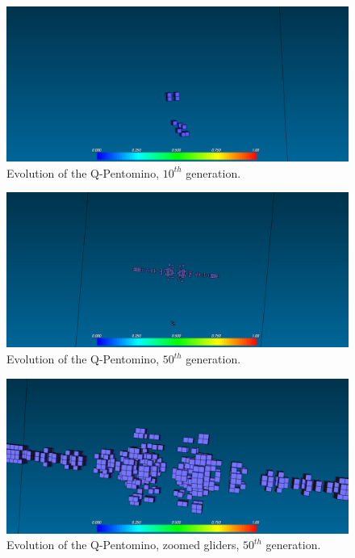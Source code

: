 \begin{figure}
	\centering
	\includegraphics[scale=0.3]{pentominoes_ss/q_10.png}
	\caption{Evolution of the Q-Pentomino, $10^{th}$ generation.}
  \label{fig:ss-pent:q-10}
\end{figure}

\begin{figure}
	\centering
	\includegraphics[scale=0.3]{pentominoes_ss/q_50.png}
	\caption{Evolution of the Q-Pentomino, $50^{th}$ generation.}
  \label{fig:ss-pent:q-50}
\end{figure}

\begin{figure}
	\centering
	\includegraphics[scale=0.3]{pentominoes_ss/q_50_gliders.png}
	\caption{Evolution of the Q-Pentomino, zoomed gliders, $50^{th}$ generation.}
  \label{fig:ss-pent:q-50-gliders}
\end{figure}

